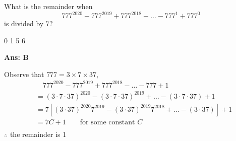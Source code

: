\documentclass[varwidth=90mm]{standalone}
\begin{document}
What is the remainder when $$777^{2020}-777^{2019}+777^{2018}-\ldots - 777^{1} + 777^{0}$$ is divided by 7?

\begin{choices}
\choice \num{0}
\choice \num{1}%
\choice \num{5}
\choice \num{6}
\end{choices}

\begin{answer}
\hrulefill\par
\textbf{Ans: B}

Observe that $777 = 3\times 7\times 37$,
\begin{equation*}
\begin{aligned}
&\quad 777^{2020}-777^{2019}+777^{2018}-\ldots -777 + 1 \\
&= (3\cdot 7\cdot 37)^{2020} - (3\cdot 7\cdot 37)^{2019} +\ldots - (3\cdot 7\cdot 37) + 1 \\
&= 7\left[(3\cdot 37)^{2020}7^{2019}-(3\cdot 37)^{2019}7^{2018}+\ldots-(3\cdot 37)\right] + 1 \\
&= 7C + 1 \qquad \text{for some constant } C \\
\end{aligned}
\end{equation*}
$\therefore$ the remainder is 1

\end{answer}
\end{document}
